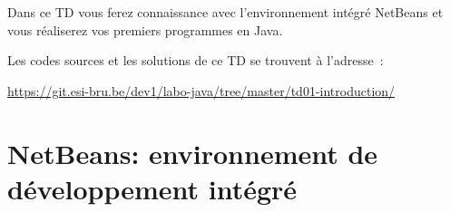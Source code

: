 \documentclass[a4paper,11pt]{article}
\date{2018 -- 2019}
\newcommand{\publicbasepath}{https://git.esi-bru.be/dev1/labo-java/tree/master/td01-introduction}
\newcommand{\sourcespublicpath}{\publicbasepath/}
\begin{document}
\entete
\titre

\lastedit


	Dans ce TD vous ferez connaissance avec l'environnement intégré NetBeans et 
	vous réaliserez vos premiers programmes en Java.

	Les codes sources et les solutions de ce TD se trouvent à l'adresse~: 
	
	\url{\sourcespublicpath}
	

	\tableofcontents

	\newpage

\section{NetBeans: environnement de développement intégré }
\end{document}
